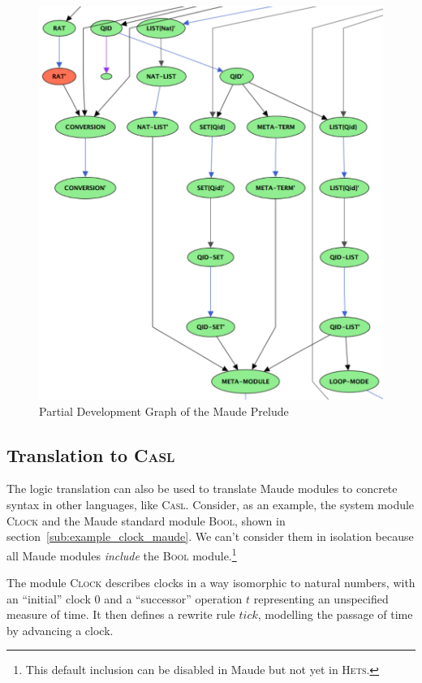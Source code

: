 \documentclass[11pt]{article}
\newcommand{\Casl}{\textsc{Casl}}
\newcommand{\Hets}{\textsc{Hets}}
\begin{document}
\begin{figure}
  \includegraphics[width=\textwidth]{prelude-part.pdf}
  \caption{Partial Development Graph of the Maude Prelude}\label{fig:maude-prelude-part}
\end{figure}


\subsection{Translation to \Casl{}}
\label{sub:results_translation}

The logic translation can also be used to translate Maude modules to concrete syntax in other languages, like \Casl{}. Consider, as an example, the system module \textsc{Clock} and the Maude standard module \textsc{Bool}, shown in section~\ref{sub:example_clock_maude}. We can't consider them in isolation because all Maude modules \emph{include} the \textsc{Bool} module.\footnote{This default inclusion can be disabled in Maude but not yet in \Hets{}.}

The module \textsc{Clock} describes clocks in a way isomorphic to natural numbers, with an ``initial'' clock $0$ and a ``successor'' operation $t$ representing an unspecified measure of time. It then defines a rewrite rule $tick$, modelling the passage of time by advancing a clock.
\end{document}
